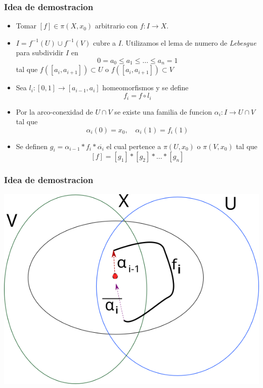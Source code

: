 \documentclass[xetex,mathserif,serif]{beamer}
\begin{document}
  \begin{frame}
    \frametitle{Idea de demostracion}
    \begin{itemize}
    \item Tomar \([f] \in \pi (X, x_0)\) arbitrario con \(f : I \to X\).
    \item \(I = f^{-1} (U) \cup f^{-1} (V) \) cubre a \(I\). Utilizamos
      el lema de numero de \emph{Lebesgue} para subdividir \(I\) en
      \[ 0 =  a_0 \leq a_1 \leq \dots \leq a_n = 1 \]
      tal que \( f ([a_i, a_{i+1}]) \subset U\) o \( f ([a_i, a_{i+1}])
      \subset V \)
    \item Sea \(l_i : [0,1] \to [a_{i-1}, a_i]\) homeomorfismos y se
      define
      \[ f_i = f \circ l_i \]
    \item Por la arco-conexidad de \(U \cap V\) se existe una familia de
      funcion \(\alpha_i : I \to U \cap V\) tal que
      \[ \alpha_i (0) = x_0 , \quad \alpha_i (1) = f_i (1)\]
    \item Se definen \(g_i = \alpha_{i-1} * f_i * \overline{\alpha_{i}}
      \) el cual pertence a \(\pi (U, x_0)\) o \(\pi(V, x_0)\) tal que
      \[ [f] = [g_1] * [g_2] * \dotsc * [g_n] \]
    \end{itemize}
  \end{frame}
  \begin{frame}
    \frametitle{Idea de demostracion}
    \begin{center}
       \includegraphics[scale=0.5]{./imag/paso-vank.png}
    \end{center}
  \end{frame}
\end{document}
